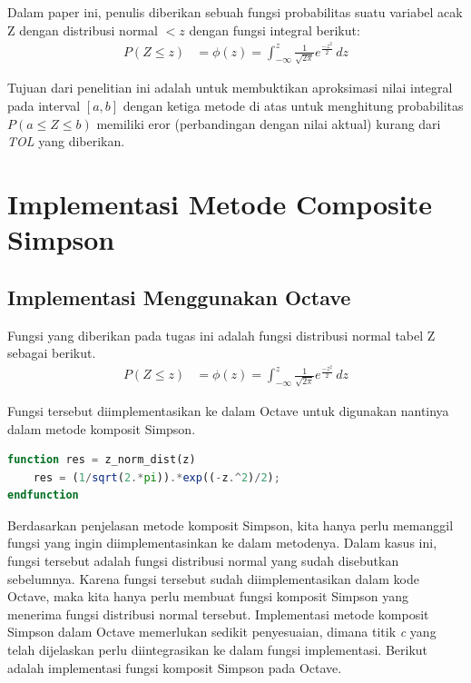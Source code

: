 \documentclass[journal,12pt,onecolumn,a4paper]{IEEEtran}
\begin{document}
Dalam paper ini, penulis diberikan sebuah fungsi probabilitas suatu variabel acak Z dengan distribusi normal \(< z\) dengan fungsi integral berikut:
\begin{equation*}
	\begin{split}
		P(Z \le z ) & = \phi(z) = \int_{-\infty}^{z} \frac{1}{\sqrt{2\pi}}e ^{\frac{-z^2}{2}} \,dz
	\end{split}
\end{equation*}

Tujuan dari penelitian ini adalah untuk membuktikan aproksimasi nilai integral pada interval \([a, b]\) dengan ketiga metode di atas untuk menghitung probabilitas \(P(a \le Z \le b)\) memiliki eror (perbandingan dengan nilai aktual) kurang dari \emph{TOL} yang diberikan.


\section{Implementasi Metode Composite Simpson}

\subsection{Implementasi Menggunakan Octave}

\par Fungsi yang diberikan pada tugas ini adalah fungsi distribusi normal tabel Z sebagai berikut.
\begin{equation*}
	\begin{split}
		P(Z \le z ) & = \phi(z) = \int_{-\infty}^{z} \frac{1}{\sqrt{2\pi}}e ^{\frac{-z^2}{2}} \,dz
	\end{split}
\end{equation*}

Fungsi tersebut diimplementasikan ke dalam Octave untuk digunakan nantinya dalam metode komposit Simpson.

\begin{center}
	\begin{lstlisting}[language=Octave]
function res = z_norm_dist(z)
	res = (1/sqrt(2.*pi)).*exp((-z.^2)/2);
endfunction
	\end{lstlisting}
\end{center}

Berdasarkan penjelasan metode komposit Simpson, kita hanya perlu memanggil fungsi yang ingin diimplementasinkan ke dalam metodenya. Dalam kasus ini, fungsi tersebut adalah fungsi distribusi normal yang sudah disebutkan sebelumnya. Karena fungsi tersebut sudah diimplementasikan dalam kode Octave, maka kita hanya perlu membuat fungsi komposit Simpson yang menerima fungsi distribusi normal tersebut. Implementasi metode komposit Simpson dalam Octave memerlukan sedikit penyesuaian, dimana titik \emph{c} yang telah dijelaskan perlu diintegrasikan ke dalam fungsi implementasi. Berikut adalah implementasi fungsi komposit Simpson pada Octave.
\end{document}
